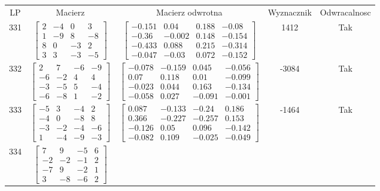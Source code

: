 \documentclass[a4paper,12pt]{article}
\begin{document}
\bgroup {} \vspace{0.2in} \begin{tabular}{c c c c c}
LP & Macierz & Macierz odwrotna & Wyznacznik & Odwracalnosc\\
331
&
$\begin{bmatrix} 2 & -4 & 0 & 3 \\ 1 & -9 & 8 & -8 \\ 8 & 0 & -3 & 2 \\ 3 & 3 & -3 & -5 \end{bmatrix}$
&
$\begin{bmatrix} -0.151 & 0.04 & 0.188 & -0.08 \\ -0.36 & -0.002 & 0.148 & -0.154 \\ -0.433 & 0.088 & 0.215 & -0.314 \\ -0.047 & -0.03 & 0.072 & -0.152 \end{bmatrix}$
&
1412
&
Tak
\\
332
&
$\begin{bmatrix} 2 & 7 & -6 & -9 \\ -6 & -2 & 4 & 4 \\ -3 & -5 & 5 & -4 \\ -6 & -8 & 1 & -2 \end{bmatrix}$
&
$\begin{bmatrix} -0.078 & -0.159 & 0.045 & -0.056 \\ 0.07 & 0.118 & 0.01 & -0.099 \\ -0.023 & 0.044 & 0.163 & -0.134 \\ -0.058 & 0.027 & -0.091 & -0.001 \end{bmatrix}$
&
-3084
&
Tak
\\
333
&
$\begin{bmatrix} -5 & 3 & -4 & 2 \\ -4 & 0 & -8 & 8 \\ -3 & -2 & -4 & -6 \\ 1 & -4 & -9 & -3 \end{bmatrix}$
&
$\begin{bmatrix} 0.087 & -0.133 & -0.24 & 0.186 \\ 0.366 & -0.227 & -0.257 & 0.153 \\ -0.126 & 0.05 & 0.096 & -0.142 \\ -0.082 & 0.109 & -0.025 & -0.049 \end{bmatrix}$
&
-1464
&
Tak
\\
334
&
$\begin{bmatrix} 7 & 9 & -5 & 6 \\ -2 & -2 & -1 & 2 \\ -7 & 9 & -2 & 1 \\ 3 & -8 & -6 & 2 \end{bmatrix}$

\end{tabular}
\end{document}
